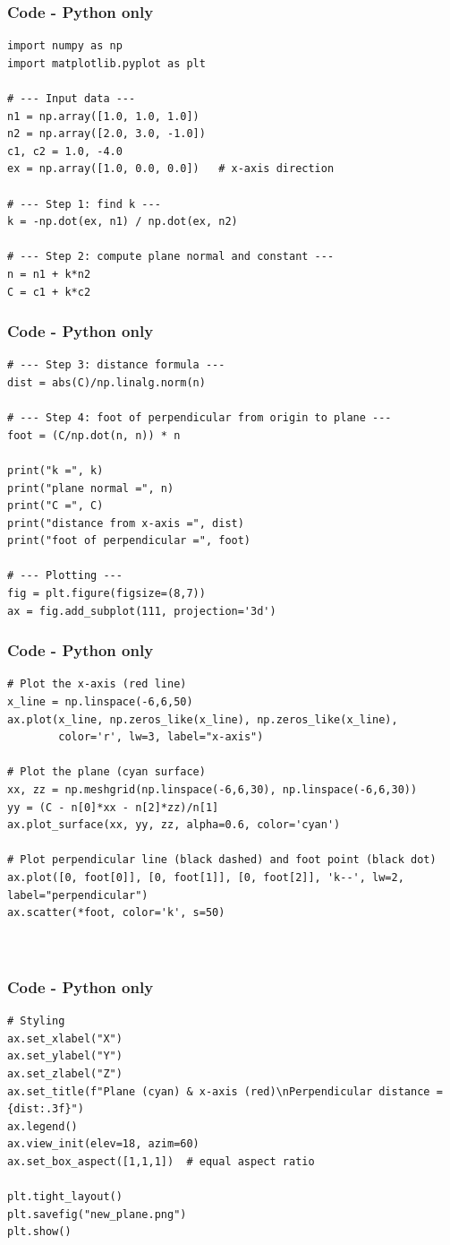 \documentclass{beamer}
\theoremstyle{remark}
\numberwithin{equation}{section}
\begin{document}
\begin{frame}[fragile]
\frametitle{Code - Python only}
\begin{lstlisting}
import numpy as np
import matplotlib.pyplot as plt

# --- Input data ---
n1 = np.array([1.0, 1.0, 1.0])
n2 = np.array([2.0, 3.0, -1.0])
c1, c2 = 1.0, -4.0
ex = np.array([1.0, 0.0, 0.0])   # x-axis direction

# --- Step 1: find k ---
k = -np.dot(ex, n1) / np.dot(ex, n2)

# --- Step 2: compute plane normal and constant ---
n = n1 + k*n2
C = c1 + k*c2

\end{lstlisting}
\end{frame}
\begin{frame}[fragile]
\frametitle{Code - Python only}
\begin{lstlisting}
# --- Step 3: distance formula ---
dist = abs(C)/np.linalg.norm(n)

# --- Step 4: foot of perpendicular from origin to plane ---
foot = (C/np.dot(n, n)) * n

print("k =", k)
print("plane normal =", n)
print("C =", C)
print("distance from x-axis =", dist)
print("foot of perpendicular =", foot)

# --- Plotting ---
fig = plt.figure(figsize=(8,7))
ax = fig.add_subplot(111, projection='3d')
\end{lstlisting}
\end{frame}

\begin{frame}[fragile]
\frametitle{Code - Python only}
\begin{lstlisting}
# Plot the x-axis (red line)
x_line = np.linspace(-6,6,50)
ax.plot(x_line, np.zeros_like(x_line), np.zeros_like(x_line),
        color='r', lw=3, label="x-axis")

# Plot the plane (cyan surface)
xx, zz = np.meshgrid(np.linspace(-6,6,30), np.linspace(-6,6,30))
yy = (C - n[0]*xx - n[2]*zz)/n[1]
ax.plot_surface(xx, yy, zz, alpha=0.6, color='cyan')

# Plot perpendicular line (black dashed) and foot point (black dot)
ax.plot([0, foot[0]], [0, foot[1]], [0, foot[2]], 'k--', lw=2, label="perpendicular")
ax.scatter(*foot, color='k', s=50)



\end{lstlisting}
\end{frame}

\begin{frame}[fragile]
\frametitle{Code - Python only}
\begin{lstlisting}
# Styling
ax.set_xlabel("X")
ax.set_ylabel("Y")
ax.set_zlabel("Z")
ax.set_title(f"Plane (cyan) & x-axis (red)\nPerpendicular distance = {dist:.3f}")
ax.legend()
ax.view_init(elev=18, azim=60)
ax.set_box_aspect([1,1,1])  # equal aspect ratio

plt.tight_layout()
plt.savefig("new_plane.png")
plt.show()

\end{lstlisting}
\end{frame}
\end{document}
